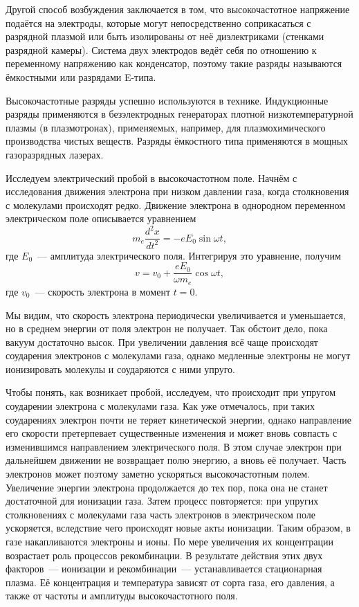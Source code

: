 Другой способ возбуждения заключается в том, что высокочастотное напряжение
подаётся на электроды, которые могут
непосредственно соприкасаться с разрядной плазмой или быть изолированы от неё
диэлектриками (стенками разрядной камеры).
Система двух электродов ведёт себя по отношению к переменному напряжению как
конденсатор, поэтому такие разряды
называются ёмкостными или разрядами E-типа.

Высокочастотные разряды успешно используются в технике. Индукционные разряды
применяются в безэлектродных генераторах
плотной низкотемпературной плазмы (в плазмотронах), применяемых, например, для
плазмохимического производства чистых
веществ. Разряды ёмкостного типа применяются в мощных газоразрядных лазерах.

Исследуем электрический пробой в высокочастотном поле. Начнём с исследования
движения электрона при низком давлении
газа, когда столкновения с молекулами происходят редко. Движение электрона в
однородном переменном электрическом поле
описывается уравнением
\begin{equation*}
	m_e\frac{d^2x}{dt^2}=-eE_0\sin\omega t,
\end{equation*}
где $E_0$~--- амплитуда электрического поля. Интегрируя это уравнение, получим
\begin{equation*}
	v=v_0+\frac{eE_0}{\omega m_e}\cos\omega t,
\end{equation*}
где $v_0$~--- скорость электрона в момент $t=0$.

Мы видим, что скорость электрона периодически увеличивается и уменьшается, но в
среднем энергии от поля электрон не
получает. Так обстоит дело, пока вакуум достаточно высок. При увеличении
давления всё чаще происходят соударения
электронов с молекулами газа, однако медленные электроны не могут ионизировать
молекулы и соударяются с ними упруго.

Чтобы понять, как возникает пробой, исследуем, что происходит при упругом
соударении электрона с молекулами газа. Как
уже отмечалось, при таких соударениях электрон почти не теряет кинетической
энергии, однако направление его скорости
претерпевает существенные изменения и может вновь совпасть с изменившимся
направлением электрического поля. В этом
случае электрон при дальнейшем движении не возвращает полю энергию, а вновь её
получает. Часть электронов может поэтому
заметно ускоряться высокочастотным полем. Увеличение энергии электрона
продолжается до тех пор, пока она не станет
достаточной для ионизации газа. Затем процесс повторяется: при упругих
столкновениях с молекулами газа часть электронов
в электрическом поле ускоряется, вследствие чего происходят новые акты
ионизации. Таким образом, в газе накапливаются
электроны и ионы. По мере увеличения их концентрации возрастает роль процессов
рекомбинации. В результате действия этих
двух факторов~--- ионизации и рекомбинации~--- устанавливается стационарная
плазма. Её концентрация и температура
зависят от сорта газа, его давления, а также от частоты и амплитуды
высокочастотного поля.

